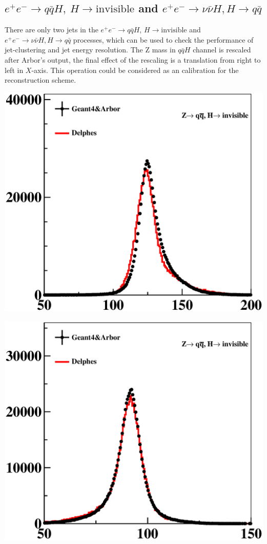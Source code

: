 \documentclass[a4paper,10pt,twoside]{cpc-hepnp}
\begin{document}
\subsection{$e^+e^-\to q\bar{q}H,~H \to\mbox{invisible}$ and $e^+e^-\to \nu\bar{\nu}H, H\to q\bar{q}$}

There are only two jets in the $e^+e^-\to q\bar{q}H$, $H \to\mbox{invisible}$ and $e^+e^-\to \nu\bar{\nu}H, H\to q\bar{q}$ processes, which can be used to check the performance of jet-clustering and jet energy resolution.
The Z mass in $q\bar{q}H$ channel is rescaled after Arbor's output, the final effect of the rescaling is a translation from right to left in $X$-axis. This operation could be considered as an calibration for the reconstruction scheme. 


\begin{center}
\includegraphics[width=0.9\linewidth]{qqh_reco}
\end{center}
\begin{center}
\includegraphics[width=0.9\linewidth]{qqh_mass}
\end{center}
\end{document}
